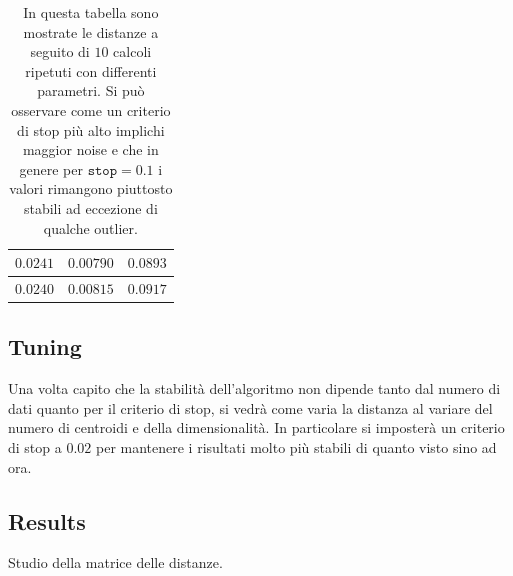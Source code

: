 \begin{toDo}
\begin{table}[h]
\begin{tabular}{|c|c|c|}
			\hline
			$\num{0.0241}$ & $\num{0.00790}$ & $\num{0.0893}$ \\
			\hline
			$\num{0.0240}$ & $\num{0.00815}$ & $\num{0.0917}$ \\
			\hline
		\end{tabular}
		\caption[Stability of comparison algorithm]{In questa tabella sono mostrate le distanze a seguito di $10$ calcoli ripetuti con differenti parametri. Si può osservare come un criterio di stop più alto implichi maggior noise e che in genere per $\texttt{stop}=0.1$ i valori rimangono piuttosto stabili ad eccezione di qualche outlier.}
		\label{tab:distStability}
	\end{table}

	\subsection{Tuning}
	Una volta capito che la stabilità dell'algoritmo non dipende tanto dal numero di dati quanto per il criterio di stop, si vedrà come varia la distanza al variare del numero di centroidi e della dimensionalità. In particolare si imposterà un criterio di stop a $0.02$ per mantenere i risultati molto più stabili di quanto visto sino ad ora.

	\subsection{Results}
	Studio della matrice delle distanze.
\end{toDo}
